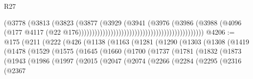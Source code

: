 \begin{lexlean}{R27}
\begin{coremodule}
                                                                          (@3778
                                                                            (@3813
                                                                              (@3823
                                                                                (@3877
                                                                                  (@3929
                                                                                    (@3941
                                                                                      (@3976
                                                                                        (@3986
                                                                                          (@3988
                                                                                            (@4096
                                                                                              (@177
                                                                                                @4117
                                                                                                (@22
                                                                                                  @176)))))))))))))))))))))))))))))))))))))))))))))))
@4206 := @175
    (@211
      (@222
        (@426
          (@1138
            (@1163
              (@1281
                (@1290
                  (@1303
                    (@1308
                      (@1419
                        (@1478
                          (@1529
                            (@1575
                              (@1645
                                (@1660
                                  (@1700
                                    (@1737
                                      (@1781
                                        (@1832
                                          (@1873
                                            (@1943
                                              (@1986
                                                (@1997
                                                  (@2015
                                                    (@2047
                                                      (@2074
                                                        (@2266
                                                          (@2284
                                                            (@2295
                                                              (@2316
                                                                (@2367

\end{coremodule}
\end{lexlean}
